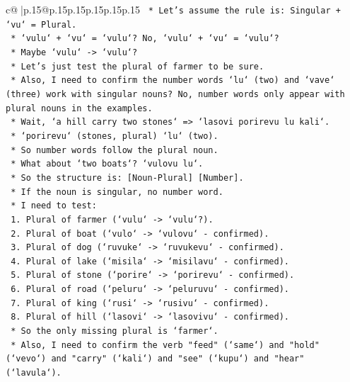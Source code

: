 \documentclass{article}
\begin{document}
{\begin{supertabular}{c@{$\;$}|p{.15\linewidth}@{}p{.15\linewidth}p{.15\linewidth}p{.15\linewidth}p{.15\linewidth}p{.15\linewidth}}
{{{\texttt{        *   Let's assume the rule is: Singular + `vu` = Plural.} \\
\texttt{        *   `vulu` + `vu` = `vulu`? No, `vulu` + `vu` = `vulu`?} \\
\texttt{        *   Maybe `vulu` {-}> `vulu`?} \\
\texttt{        *   Let's just test the plural of farmer to be sure.} \\
\texttt{        *   Also, I need to confirm the number words `lu` (two) and `vave` (three) work with singular nouns? No, number words only appear with plural nouns in the examples.} \\
\texttt{        *   Wait, `a hill carry two stones` => `lasovi porirevu lu kali`.} \\
\texttt{        *   `porirevu` (stones, plural) `lu` (two).} \\
\texttt{        *   So number words follow the plural noun.} \\
\texttt{        *   What about `two boats`? `vulovu lu`.} \\
\texttt{        *   So the structure is: {[}Noun{-}Plural{]} {[}Number{]}.} \\
\texttt{        *   If the noun is singular, no number word.} \\
\texttt{        *   I need to test:} \\
\texttt{            1.  Plural of farmer (`vulu` {-}> `vulu`?).} \\
\texttt{            2.  Plural of boat (`vulo` {-}> `vulovu` {-} confirmed).} \\
\texttt{            3.  Plural of dog (`ruvuke` {-}> `ruvukevu` {-} confirmed).} \\
\texttt{            4.  Plural of lake (`misila` {-}> `misilavu` {-} confirmed).} \\
\texttt{            5.  Plural of stone (`porire` {-}> `porirevu` {-} confirmed).} \\
\texttt{            6.  Plural of road (`peluru` {-}> `peluruvu` {-} confirmed).} \\
\texttt{            7.  Plural of king (`rusi` {-}> `rusivu` {-} confirmed).} \\
\texttt{            8.  Plural of hill (`lasovi` {-}> `lasovivu` {-} confirmed).} \\
\texttt{        *   So the only missing plural is `farmer`.} \\
\texttt{        *   Also, I need to confirm the verb "feed" (`same`) and "hold" (`vevo`) and "carry" (`kali`) and "see" (`kupu`) and "hear" (`lavula`).} \\
}}}
\end{supertabular}}
\end{document}
